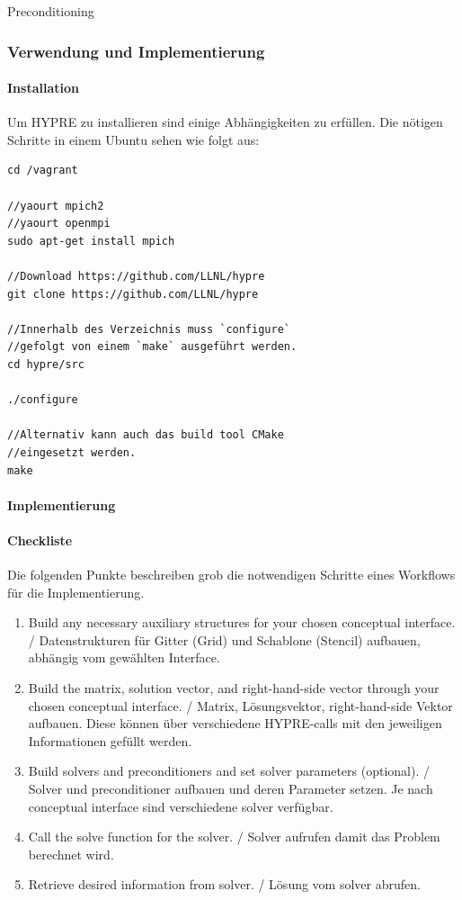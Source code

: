 \documentclass[a4paper,10pt]{article}
\numberwithin{figure}{section}
\numberwithin{table}{section}
\begin{document}
Preconditioning	\cite{FritzschePreconditioning}

\subsubsection{Verwendung und Implementierung}

\paragraph{Installation}
Um HYPRE zu installieren sind einige Abhängigkeiten zu erfüllen.
Die nötigen Schritte in einem Ubuntu sehen wie folgt aus:
\begin{lstlisting}[frame=single,caption=Installation HYPRE in Ubuntu, breaklines=true]
cd /vagrant

//yaourt mpich2
//yaourt openmpi
sudo apt-get install mpich

//Download https://github.com/LLNL/hypre
git clone https://github.com/LLNL/hypre

//Innerhalb des Verzeichnis muss `configure`
//gefolgt von einem `make` ausgeführt werden.
cd hypre/src

./configure

//Alternativ kann auch das build tool CMake
//eingesetzt werden.
make
\end{lstlisting}

\paragraph{Implementierung}

\paragraph{Checkliste}

Die folgenden Punkte beschreiben grob die notwendigen Schritte eines Workflows für die Implementierung.

\begin{enumerate}
 \item Build any necessary auxiliary structures for your chosen conceptual interface. /
 Datenstrukturen für Gitter (Grid) und Schablone (Stencil) aufbauen, abhängig vom gewählten Interface.
 \item Build the matrix, solution vector, and right-hand-side vector through your chosen conceptual interface. /
 Matrix, Lösungsvektor, right-hand-side Vektor aufbauen.
 Diese können über verschiedene HYPRE-calls mit den jeweiligen Informationen gefüllt werden.
 \item Build solvers and preconditioners and set solver parameters (optional). /
 Solver und preconditioner aufbauen und deren Parameter setzen.
 Je nach conceptual interface sind verschiedene solver verfügbar.
 \item Call the solve function for the solver. /
 Solver aufrufen damit das Problem berechnet wird.
 \item Retrieve desired information from solver. /
 Lösung vom solver abrufen.
\end{enumerate}
\end{document}

